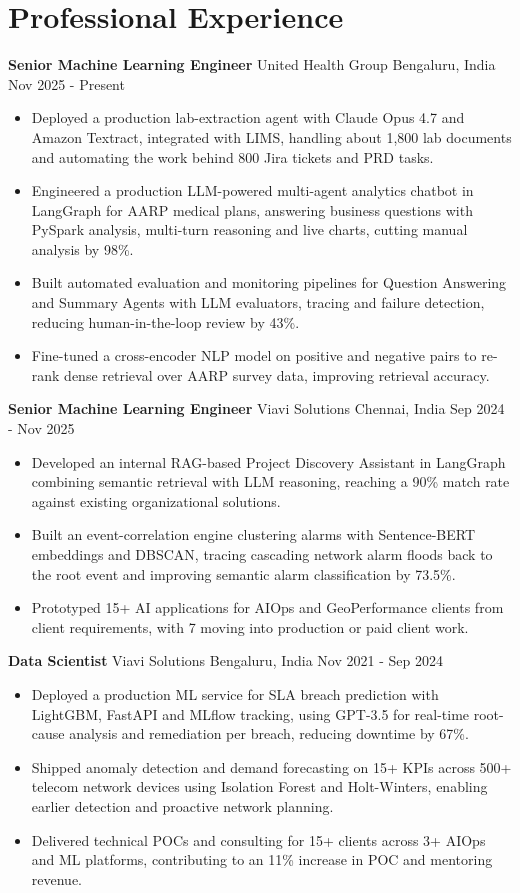 \documentclass[10pt,a4paper]{article}
\newcommand{\role}[4]{\textbf{#1} \textbar{} #2 \hfill #3 \textbar{} #4\par}
\begin{document}
\section{Professional Experience}
\role{Senior Machine Learning Engineer}{United Health Group}{Bengaluru, India}{Nov 2025 - Present}
\begin{itemize}
  \item Deployed a production lab-extraction agent with Claude Opus 4.7 and Amazon Textract, integrated with LIMS, handling about 1,800 lab documents and automating the work behind 800 Jira tickets and PRD tasks.
  \item Engineered a production LLM-powered multi-agent analytics chatbot in LangGraph for AARP medical plans, answering business questions with PySpark analysis, multi-turn reasoning and live charts, cutting manual analysis by 98\%.
  \item Built automated evaluation and monitoring pipelines for Question Answering and Summary Agents with LLM evaluators, tracing and failure detection, reducing human-in-the-loop review by 43\%.
  \item Fine-tuned a cross-encoder NLP model on positive and negative pairs to re-rank dense retrieval over AARP survey data, improving retrieval accuracy.
\end{itemize}
\vspace{3pt}
\role{Senior Machine Learning Engineer}{Viavi Solutions}{Chennai, India}{Sep 2024 - Nov 2025}
\begin{itemize}
  \item Developed an internal RAG-based Project Discovery Assistant in LangGraph combining semantic retrieval with LLM reasoning, reaching a 90\% match rate against existing organizational solutions.
  \item Built an event-correlation engine clustering alarms with Sentence-BERT embeddings and DBSCAN, tracing cascading network alarm floods back to the root event and improving semantic alarm classification by 73.5\%.
  \item Prototyped 15+ AI applications for AIOps and GeoPerformance clients from client requirements, with 7 moving into production or paid client work.
\end{itemize}
\vspace{3pt}
\role{Data Scientist}{Viavi Solutions}{Bengaluru, India}{Nov 2021 - Sep 2024}
\begin{itemize}
  \item Deployed a production ML service for SLA breach prediction with LightGBM, FastAPI and MLflow tracking, using GPT-3.5 for real-time root-cause analysis and remediation per breach, reducing downtime by 67\%.
  \item Shipped anomaly detection and demand forecasting on 15+ KPIs across 500+ telecom network devices using Isolation Forest and Holt-Winters, enabling earlier detection and proactive network planning.
  \item Delivered technical POCs and consulting for 15+ clients across 3+ AIOps and ML platforms, contributing to an 11\% increase in POC and mentoring revenue.
\end{itemize}
\end{document}
